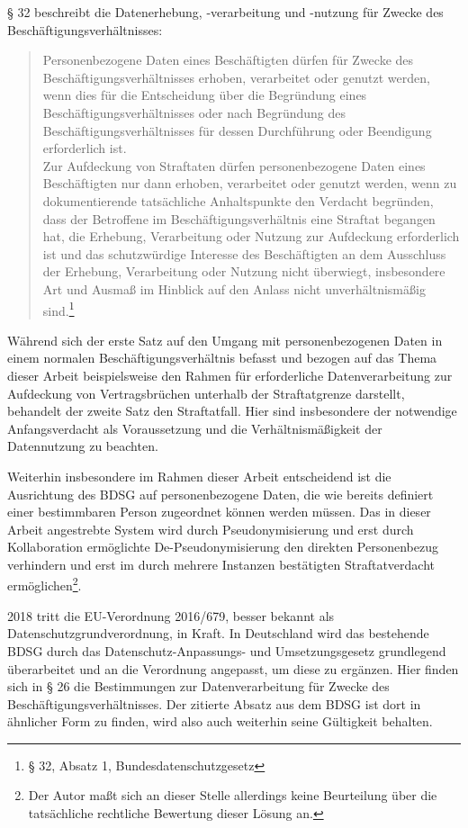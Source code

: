 § 32 beschreibt die Datenerhebung, -verarbeitung und -nutzung für Zwecke des Beschäftigungsverhältnisses:
\begin{quotation}
Personenbezogene Daten eines Beschäftigten dürfen für Zwecke des Beschäftigungsverhältnisses erhoben, verarbeitet oder genutzt werden, wenn dies für die Entscheidung über die Begründung eines Beschäftigungsverhältnisses oder nach Begründung des Beschäftigungsverhältnisses für dessen Durchführung oder Beendigung erforderlich ist.\\
Zur Aufdeckung von Straftaten dürfen personenbezogene Daten eines Beschäftigten nur dann erhoben, verarbeitet oder genutzt werden, wenn zu dokumentierende tatsächliche Anhaltspunkte den Verdacht begründen, dass der Betroffene im Beschäftigungsverhältnis eine Straftat begangen hat, die Erhebung, Verarbeitung oder Nutzung zur Aufdeckung erforderlich ist und das schutzwürdige Interesse des Beschäftigten an dem Ausschluss der Erhebung, Verarbeitung oder Nutzung nicht überwiegt, insbesondere Art und Ausmaß im Hinblick auf den Anlass nicht unverhältnismäßig sind.\footnote{
  § 32, Absatz 1, Bundesdatenschutzgesetz
}
\end{quotation}

Während sich der erste Satz auf den Umgang mit personenbezogenen Daten in einem normalen Beschäftigungsverhältnis befasst und bezogen auf das Thema dieser Arbeit beispielsweise den Rahmen für erforderliche Datenverarbeitung zur Aufdeckung von Vertragsbrüchen unterhalb der Straftatgrenze darstellt, behandelt der zweite Satz den Straftatfall. Hier sind insbesondere der notwendige Anfangsverdacht als Voraussetzung und die Verhältnismäßigkeit der Datennutzung zu beachten. 

Weiterhin insbesondere im Rahmen dieser Arbeit entscheidend ist die Ausrichtung des BDSG auf personenbezogene Daten, die wie bereits definiert einer bestimmbaren Person zugeordnet können werden müssen. Das in dieser Arbeit angestrebte System wird durch Pseudonymisierung und erst durch Kollaboration ermöglichte De-Pseudonymisierung den direkten Personenbezug verhindern und erst im durch mehrere Instanzen bestätigten Straftatverdacht ermöglichen\footnote{
  Der Autor maßt sich an dieser Stelle allerdings keine Beurteilung über die tatsächliche rechtliche Bewertung dieser Lösung an.
}.

2018 tritt die EU-Verordnung 2016/679, besser bekannt als Datenschutzgrundverordnung, in Kraft. In Deutschland wird das bestehende BDSG durch das Datenschutz-Anpassungs- und Umsetzungsgesetz grundlegend überarbeitet und an die Verordnung angepasst, um diese zu ergänzen. Hier finden sich in § 26 die Bestimmungen zur Datenverarbeitung für Zwecke des Beschäftigungsverhältnisses. Der zitierte Absatz aus dem BDSG ist dort in ähnlicher Form zu finden, wird also auch weiterhin seine Gültigkeit behalten. 

